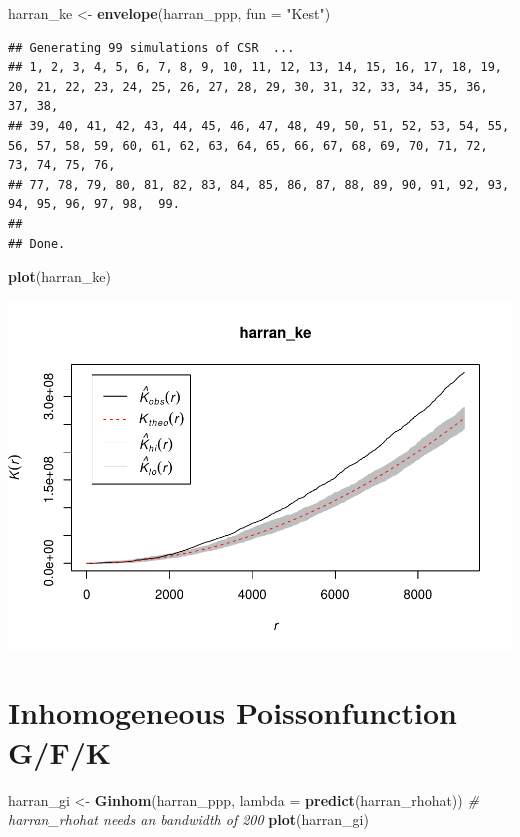 \documentclass[]{article}
\newenvironment{Shaded}{\begin{snugshade}}{\end{snugshade}}
\newcommand{\KeywordTok}[1]{\textcolor[rgb]{0.13,0.29,0.53}{\textbf{{#1}}}}
\newcommand{\DataTypeTok}[1]{\textcolor[rgb]{0.13,0.29,0.53}{{#1}}}
\newcommand{\StringTok}[1]{\textcolor[rgb]{0.31,0.60,0.02}{{#1}}}
\newcommand{\CommentTok}[1]{\textcolor[rgb]{0.56,0.35,0.01}{\textit{{#1}}}}
\newcommand{\NormalTok}[1]{{#1}}
\begin{document}
\begin{Shaded}
\begin{Highlighting}[]
\NormalTok{harran_ke <-}\StringTok{ }\KeywordTok{envelope}\NormalTok{(harran_ppp, }\DataTypeTok{fun =} \StringTok{"Kest"}\NormalTok{)}
\end{Highlighting}
\end{Shaded}

\begin{verbatim}
## Generating 99 simulations of CSR  ...
## 1, 2, 3, 4, 5, 6, 7, 8, 9, 10, 11, 12, 13, 14, 15, 16, 17, 18, 19, 20, 21, 22, 23, 24, 25, 26, 27, 28, 29, 30, 31, 32, 33, 34, 35, 36, 37, 38,
## 39, 40, 41, 42, 43, 44, 45, 46, 47, 48, 49, 50, 51, 52, 53, 54, 55, 56, 57, 58, 59, 60, 61, 62, 63, 64, 65, 66, 67, 68, 69, 70, 71, 72, 73, 74, 75, 76,
## 77, 78, 79, 80, 81, 82, 83, 84, 85, 86, 87, 88, 89, 90, 91, 92, 93, 94, 95, 96, 97, 98,  99.
## 
## Done.
\end{verbatim}

\begin{Shaded}
\begin{Highlighting}[]
\KeywordTok{plot}\NormalTok{(harran_ke) }
\end{Highlighting}
\end{Shaded}

\includegraphics{HarranPlain_files/figure-latex/unnamed-chunk-10-4.pdf}

\section{Inhomogeneous Poissonfunction
G/F/K}\label{inhomogeneous-poissonfunction-gfk}

\begin{Shaded}
\begin{Highlighting}[]
\NormalTok{harran_gi <-}\StringTok{ }\KeywordTok{Ginhom}\NormalTok{(harran_ppp, }\DataTypeTok{lambda =} \KeywordTok{predict}\NormalTok{(harran_rhohat)) }\CommentTok{# harran_rhohat needs an bandwidth of 200}
\KeywordTok{plot}\NormalTok{(harran_gi)}
\end{Highlighting}
\end{Shaded}
\end{document}
